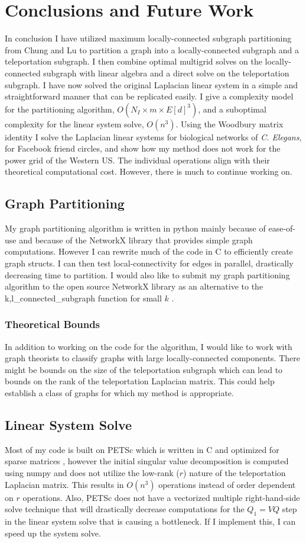 \documentclass{article}
\begin{document}
\chapter{Conclusions and Future Work}
In conclusion I have utilized maximum locally-connected subgraph partitioning from Chung and Lu to partition a graph into a locally-connected subgraph and a teleportation subgraph. I then combine optimal multigrid solves on the locally-connected subgraph with linear algebra and a direct solve on the teleportation subgraph. I have now solved the original Laplacian linear system in a simple and straightforward manner that can be replicated easily. I give a complexity model for the partitioning algorithm, $O(N_I \times m \times E[d]^3)$, and a suboptimal complexity for the linear system solve, $O(n^3)$. Using the Woodbury matrix identity \cite{Woodbury:1950} I solve the Laplacian linear systems for biological networks of \textit{C. Elegans}, for Facebook friend circles, and show how my method does not work for the power grid of the Western US. The individual operations align with their theoretical computational cost. However, there is much to continue working on.

\section{Graph Partitioning}
My graph partitioning algorithm is written in python mainly because of ease-of-use and because of the NetworkX library that provides simple graph computations. However I can rewrite much of the code in C to efficiently create graph structs. I can then test local-connectivity for edges in parallel, drastically decreasing time to partition. I would also like to submit my graph partitioning algorithm to the open source NetworkX library as an alternative to the k,l\_connected\_subgraph function for small $k$ \cite{Hagberg:2008}.
\subsection{Theoretical Bounds}
In addition to working on the code for the algorithm, I would like to work with graph theorists to classify graphs with large locally-connected components. There might be bounds on the size of the teleportation subgraph which can lead to bounds on the rank of the teleportation Laplacian matrix. This could help establish a class of graphs for which my method is appropriate.

\section{Linear System Solve}
Most of my code is built on PETSc which is written in C and optimized for sparse matrices \cite{petsc-user-ref}, however the initial singular value decomposition is computed using numpy \cite{numpy} and does not utilize the low-rank ($r$) nature of the teleportation Laplacian matrix. This results in $O(n^3)$ operations instead of order dependent on $r$ operations. Also, PETSc does not have a vectorized multiple right-hand-side solve technique that will drastically decrease computations for the $Q_1 = VQ$ step in the linear system solve that is causing a bottleneck. If I implement this, I can speed up the system solve.
\end{document}
